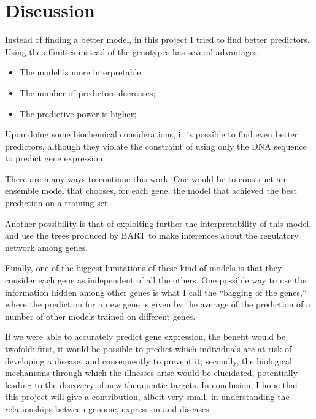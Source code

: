 \section{Discussion}

Instead of finding a better model, in this project I tried to find 
better predictors. Using the affinities instead of the genotypes has 
several advantages:

\begin{itemize}
  \item The model is more interpretable;
  \item The number of predictors decreases;
  \item The predictive power is higher;
\end{itemize}

Upon doing some biochemical considerations, it is possible to find even 
better predictors, although they violate the constraint of using only 
the DNA sequence to predict gene expression.

There are many ways to continue this work. One would be to construct an 
ensemble model that chooses, for each gene, the model that achieved the 
best prediction on a training set.

Another possibility is that of exploiting further the interpretability 
of this model, and use the trees produced by BART to make inferences 
about the regulatory network among genes.

Finally, one of the biggest limitations of these kind of models is that 
they consider each gene as independent of all the others. One possible 
way to use the information hidden among other genes is what I call the 
\enquote{bagging of the genes,} where the prediction for a new gene is 
given by the average of the prediction of a number of other models 
trained on different genes.

If we were able to accurately predict gene expression, the benefit would 
be twofold: first, it would be possible to predict which individuals are 
at risk of developing a disease, and consequently to prevent it; 
secondly, the biological mechanisms through which the illnesses arise 
would be elucidated, potentially leading to the discovery of new 
therapeutic targets. In conclusion, I hope that this project will give a 
contribution, albeit very small, in understanding the relationships 
between genome, expression and diseases.
